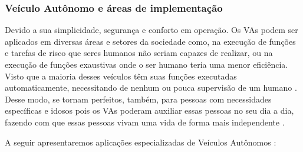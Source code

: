 \subsubsection{Veículo Autônomo e áreas de implementação} \label{implementacao}

Devido a sua simplicidade, segurança e conforto em operação. Os VAs podem ser aplicados em diversas áreas e setores da sociedade como, na execução de funções e tarefas de risco que seres humanos não seriam capazes de realizar, ou na execução de funções exaustivas onde o ser humano teria uma menor eficiência. Visto que a maioria desses veículos têm suas funções executadas automaticamente, necessitando de nenhum ou pouca supervisão de um humano \cite{mundobrasil}. Desse modo, se tornam perfeitos, também, para pessoas com necessidades específicas e idosos pois os VAs poderam auxiliar essas pessoas no seu dia a dia, fazendo com que essas pessoas vivam uma vida de forma mais independente \cite{4cenarios_ocidental}. 
\vspace {1cm}

A seguir apresentaremos aplicações especializadas de Veículos Autônomos \cite{aplicacao2}:


